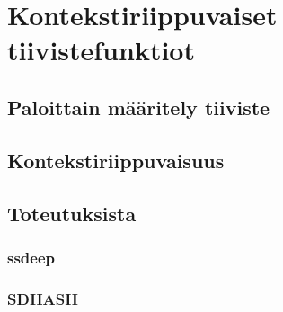 \chapter{Kontekstiriippuvaiset tiivistefunktiot}

\section{Paloittain määritely tiiviste}

\section{Kontekstiriippuvaisuus}


\section{Toteutuksista}

\subsection{ssdeep}

\subsection{SDHASH}

